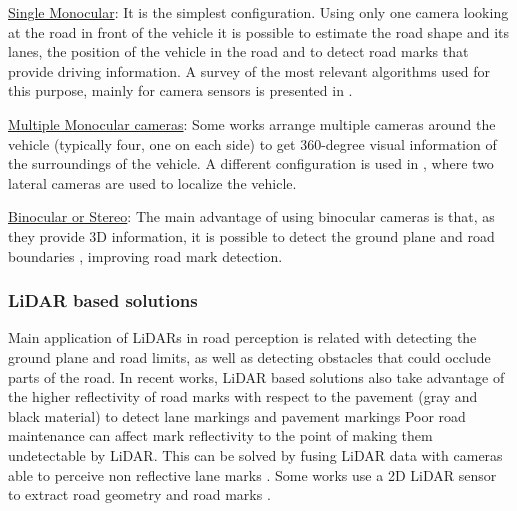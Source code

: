 \underline{Single Monocular}:
It is the simplest configuration. Using only one 
camera looking at the road in front of the vehicle it is possible to estimate 
the road shape and its lanes, the position of the vehicle in the road and to 
detect road marks  that provide driving information. A survey of the most 
relevant algorithms used for this purpose, mainly for camera sensors is 
presented in \cite{hillel2014recent}.

\underline{Multiple Monocular cameras}: 
Some works \cite{lee2017avm, kum2013lane} arrange multiple cameras 
around the vehicle (typically four, one on each side) to get 360-degree 
visual information of the surroundings of the vehicle. 
A different configuration is used in \cite{Ieng2003}, where two lateral cameras
are used to localize the vehicle. 

\underline{Binocular or Stereo}: 
The main advantage of using binocular cameras is that, as they provide 3D 
information, it is possible to detect the ground plane and road boundaries 
\cite{schreiber2013laneloc, ozgunalp2017multiple}, improving road mark 
detection. 

\subsubsection{LiDAR based solutions}
Main application of LiDARs in road perception is related with detecting the 
ground plane and road limits, as well as detecting obstacles that could occlude 
parts of the road.
In recent works, LiDAR based solutions also take advantage of the higher 
reflectivity of road marks with respect to the pavement (gray and black material) to 
detect lane markings \cite{yang2012automated, li2013new} and pavement markings \cite{Zhang2016}
Poor road maintenance can affect mark reflectivity to the point of making them
undetectable by LiDAR. This can be solved by fusing LiDAR 
data with cameras able to perceive non reflective lane marks \cite{lee2017avm}.
Some works use a 2D LiDAR sensor to extract road geometry and road marks 
\cite{nie2012camera, kim2015lane}.



